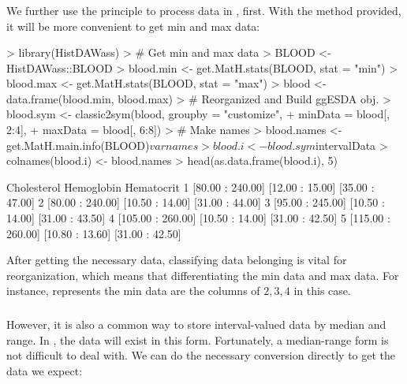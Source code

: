 \documentclass[article]{jss}
\begin{document}
\subsubsection[HistDAWass]{}

We further use the principle to process  data in , first. With the method  provided, it will be more convenient to get min and max data:

\begin{Schunk}
\begin{Sinput}
> library(HistDAWass)
> # Get min and max data
> BLOOD <- HistDAWass::BLOOD
> blood.min <- get.MatH.stats(BLOOD, stat = "min")
> blood.max <- get.MatH.stats(BLOOD, stat = "max")
> blood <- data.frame(blood.min, blood.max)
> # Reorganized and Build ggESDA obj.
> blood.sym <- classic2sym(blood, groupby = "customize",
+                      minData = blood[, 2:4],
+                      maxData = blood[, 6:8])
> # Make names
> blood.names <- get.MatH.main.info(BLOOD)$varnames
> blood.i <- blood.sym$intervalData
> colnames(blood.i) <- blood.names
> head(as.data.frame(blood.i), 5)
\end{Sinput}
\begin{Soutput}
        Cholesterol      Hemoglobin      Hematocrit
1  [80.00 : 240.00] [12.00 : 15.00] [35.00 : 47.00]
2  [80.00 : 240.00] [10.50 : 14.00] [31.00 : 44.00]
3  [95.00 : 245.00] [10.50 : 14.00] [31.00 : 43.50]
4 [105.00 : 260.00] [10.50 : 14.00] [31.00 : 42.50]
5 [115.00 : 260.00] [10.80 : 13.60] [31.00 : 42.50]
\end{Soutput}
\end{Schunk}

After getting the necessary data, classifying data belonging is vital for reorganization, which means that differentiating the min data and max data. For instance,  represents the min data are the columns of $2,3,4$ in this case.

\subsubsection[MAINT.Data]{}

However, it is also a common way to store interval-valued data by median and range. In , the data will exist in this form. Fortunately, a median-range form is not difficult to deal with. We can do the necessary conversion directly to get the data we expect:
\end{document}
